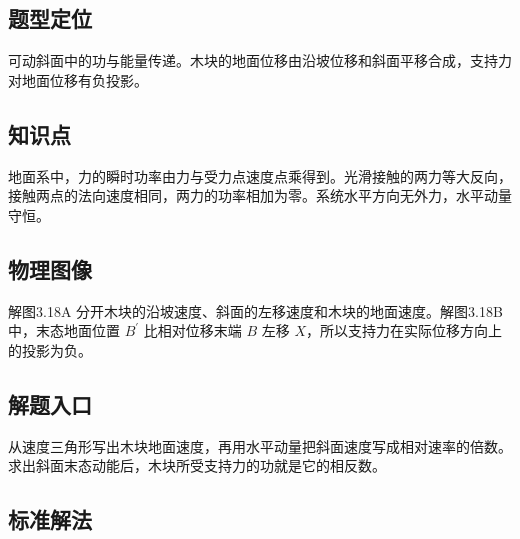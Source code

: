 \documentclass[UTF8,fontset=fandol,a4paper,11pt]{ctexart}
\begin{document}


\subsection*{题型定位}

可动斜面中的功与能量传递。木块的地面位移由沿坡位移和斜面平移合成，支持力对地面位移有负投影。



\subsection*{知识点}

地面系中，力的瞬时功率由力与受力点速度点乘得到。光滑接触的两力等大反向，接触两点的法向速度相同，两力的功率相加为零。系统水平方向无外力，水平动量守恒。




\subsection*{物理图像}

解图3.18A 分开木块的沿坡速度、斜面的左移速度和木块的地面速度。解图3.18B 中，末态地面位置 $B^{\prime}$ 比相对位移末端 $B$ 左移 $X$，所以支持力在实际位移方向上的投影为负。



\subsection*{解题入口}

从速度三角形写出木块地面速度，再用水平动量把斜面速度写成相对速率的倍数。求出斜面末态动能后，木块所受支持力的功就是它的相反数。



\subsection*{标准解法}
\end{document}
